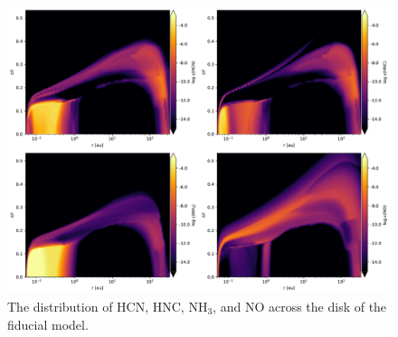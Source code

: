 \documentclass[twoside, single, authoryear, semicolon]{lion-msc}
\newcommand{\4}{$_4$}
\newcommand{\3}{$_3$}
\newcommand{\2}{$_2$}
\begin{document}
\begin{figure}[!ht]
    \centering
    \includegraphics[width=\linewidth]{Figures/Abundance.pdf}
    \caption{The distribution of HCN, HNC, NH\3, and NO across the disk of the fiducial model.}
    \label{fig:nitrogen distribution}
\end{figure}
\end{document}
